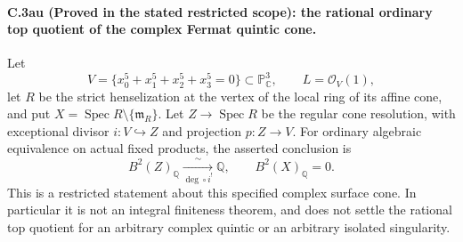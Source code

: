 \paragraph{C.3au (Proved in the stated restricted scope): the rational ordinary top quotient of the complex Fermat quintic cone.}
Let
\[
 V=\{x_0^5+x_1^5+x_2^5+x_3^5=0\}\subset\mathbb P^3_{\mathbb C},
 \qquad L=\mathcal O_V(1),
\]
let $R$ be the strict henselization at the vertex of the local ring
of its affine cone, and put
$X=\operatorname{Spec}R\setminus\{\mathfrak m_R\}$.
Let $Z\to\operatorname{Spec}R$ be the regular cone resolution,
with exceptional divisor $i:V\hookrightarrow Z$ and projection
$p:Z\to V$. For ordinary algebraic equivalence on actual fixed
products, the asserted conclusion is
\begin{equation}\label{eq:C3au-answer}
 B^2(Z)_{\mathbb Q}\xrightarrow[\deg\circ i^!]{\ \sim\ }\mathbb Q,
 \qquad B^2(X)_{\mathbb Q}=0.
\end{equation}
This is a restricted statement about this specified complex surface
cone. In particular it is not an integral finiteness theorem, and
does not settle the rational top quotient for an arbitrary complex
quintic or an arbitrary isolated singularity.

